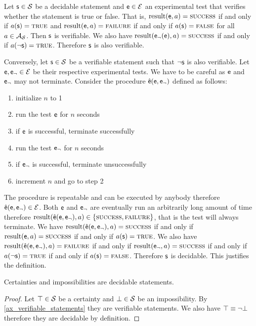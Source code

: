 \documentclass[11pt,letterpaper,fleqn]{memoir} %
\begin{document}
\begin{mathSection}
\begin{justification}
		Let $\mathsf{s} \in \mathcal{S}$ be a decidable statement and $\mathsf{e} \in \mathcal{E}$ an experimental test that verifies whether the statement is true or false. That is, $\operatorname{result}(\mathsf{e}, a) = \textsc{success}$ if and only if $a(\mathsf{s}) = \textsc{true}$ and $\operatorname{result}(\mathsf{e}, a) = \textsc{failure}$ if and only if $a(\mathsf{s}) = \textsc{false}$ for all $a \in \mathcal{A}_{\mathcal{S}}$. Then $\mathsf{s}$ is verifiable. We also have $\operatorname{result}(\mathsf{e}_\neg(\mathsf{e}), a) = \textsc{success}$ if and only if $a(\neg\mathsf{s}) = \textsc{true}$. Therefore $\mathsf{s}$ is also verifiable.

		Conversely, let $\mathsf{s} \in \mathcal{S}$ be a verifiable statement such that $\neg\mathsf{s}$ is also verifiable. Let $\mathsf{e}, \mathsf{e}_\neg \in \mathcal{E}$ be their respective experimental tests. We have to be careful as $\mathsf{e}$ and $\mathsf{e}_\neg$ may not terminate. Consider the procedure $\hat{\mathsf{e}}(\mathsf{e}, \mathsf{e}_\neg)$ defined as follows:
		\begin{enumerate}
			\item initialize $n$ to 1
			\item run the test $\mathsf{e}$ for $n$ seconds
			\item if $\mathsf{e}$ is successful, terminate successfully
			\item run the test $\mathsf{e}_\neg$ for $n$ seconds
			\item if $\mathsf{e}_\neg$ is successful, terminate unsuccessfully
			\item increment $n$ and go to step 2
		\end{enumerate}
	    The procedure is repeatable and can be executed by anybody therefore $\hat{\mathsf{e}}(\mathsf{e}, \mathsf{e}_\neg) \in \mathcal{E}$. Both $\mathsf{e}$ and $\mathsf{e}_\neg$ are eventually run an arbitrarily long amount of time therefore $\operatorname{result}(\hat{\mathsf{e}}(\mathsf{e}, \mathsf{e}_\neg), a) \in \{\textsc{success}, \textsc{failure} \}$, that is the test will always terminate. We have $\operatorname{result}(\hat{\mathsf{e}}(\mathsf{e}, \mathsf{e}_\neg), a) = \textsc{success} $ if and only if $\operatorname{result}(\mathsf{e}, a) = \textsc{success}$ if and only if $a(\mathsf{s}) = \textsc{true}$. We also have $\operatorname{result}(\hat{\mathsf{e}}(\mathsf{e}, \mathsf{e}_\neg), a) = \textsc{failure}$ if and only if $\operatorname{result}(\mathsf{e}_\neg, a) = \textsc{success}$ if and only if $a(\neg\mathsf{s}) = \textsc{true}$ if and only if $a(\mathsf{s}) = \textsc{false}$. Therefore $\mathsf{s}$ is decidable. This justifies the definition.
	\end{justification}

\begin{coro}
	Certainties and impossibilities are decidable statements.
\end{coro}
\begin{proof}
	Let $\top \in \mathcal{S}$ be a certainty and $\bot \in \mathcal{S}$ be an impossibility. By \ref{ax_verifiable_statements} they are verifiable statements. We also have $\top \equiv \neg \bot$ therefore they are decidable by definition.
\end{proof}

\end{mathSection}
\end{document}
